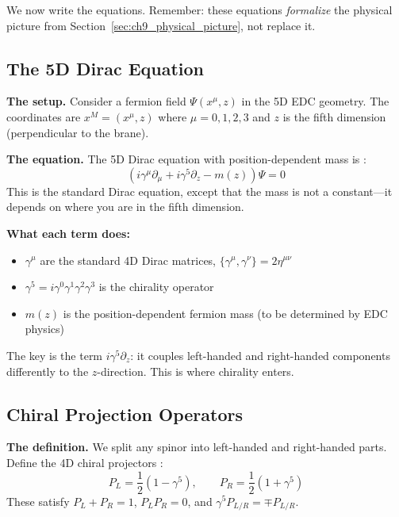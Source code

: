 We now write the equations. Remember: these equations \emph{formalize} the
physical picture from Section~\ref{sec:ch9_physical_picture}, not replace it.

\subsection{The 5D Dirac Equation}

\textbf{The setup.} Consider a fermion field $\Psi(x^\mu, z)$ in the 5D EDC geometry.
The coordinates are $x^M = (x^\mu, z)$ where $\mu = 0,1,2,3$ and $z$ is
the fifth dimension (perpendicular to the brane).

\textbf{The equation.} The 5D Dirac equation with position-dependent mass is \tagBL{}:
\begin{equation}
    \left( i\gamma^\mu \partial_\mu + i\gamma^5 \partial_z - m(z) \right) \Psi = 0
    \label{eq:ch9_5d_dirac}
\end{equation}
This is the standard Dirac equation, except that the mass is not a constant---it
depends on where you are in the fifth dimension.

\textbf{What each term does:}
\begin{itemize}[nosep]
    \item $\gamma^\mu$ are the standard 4D Dirac matrices, $\{\gamma^\mu, \gamma^\nu\} = 2\eta^{\mu\nu}$
    \item $\gamma^5 = i\gamma^0\gamma^1\gamma^2\gamma^3$ is the chirality operator
    \item $m(z)$ is the position-dependent fermion mass (to be determined by EDC physics)
\end{itemize}

The key is the term $i\gamma^5 \partial_z$: it couples left-handed and right-handed
components differently to the $z$-direction. This is where chirality enters.

\subsection{Chiral Projection Operators}

\textbf{The definition.} We split any spinor into left-handed and right-handed parts.
Define the 4D chiral projectors \tagBL{}:
\begin{equation}
    P_L = \frac{1}{2}(1 - \gamma^5), \qquad P_R = \frac{1}{2}(1 + \gamma^5)
    \label{eq:ch9_projectors}
\end{equation}
These satisfy $P_L + P_R = 1$, $P_L P_R = 0$, and $\gamma^5 P_{L/R} = \mp P_{L/R}$.


